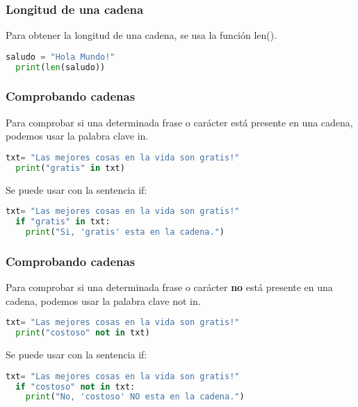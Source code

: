 \begin{frame}[fragile]
  \frametitle{Longitud de una cadena}

  Para obtener la longitud de una cadena, se usa la función
  \textcolor{codeKeyword}{len}().

  \vspace{\baselineskip}
  \begin{lstlisting}[language=Python]
  saludo = "Hola Mundo!"
  print(len(saludo))
  \end{lstlisting}
\end{frame}

\begin{frame}[fragile]
  \frametitle{Comprobando cadenas}

  Para comprobar si una determinada frase o carácter está presente
  en una cadena, podemos usar la palabra clave
  \textcolor{codeKeyword}{in}.

  \begin{lstlisting}[language=Python]
  txt= "Las mejores cosas en la vida son gratis!"
  print("gratis" in txt)
  \end{lstlisting}

  \pausa
  Se puede usar con la sentencia \textcolor{codeKeyword}{if}:

  \begin{lstlisting}[language=Python]
  txt= "Las mejores cosas en la vida son gratis!"
  if "gratis" in txt:
    print("Si, 'gratis' esta en la cadena.")
  \end{lstlisting}
\end{frame}

\begin{frame}[fragile]
  \frametitle{Comprobando cadenas}

  Para comprobar si una determinada frase o carácter \textbf{no}
  está presente en una cadena, podemos usar la palabra clave
  \textcolor{codeKeyword}{not in}.

  \begin{lstlisting}[language=Python]
  txt= "Las mejores cosas en la vida son gratis!"
  print("costoso" not in txt)
  \end{lstlisting}

  \pausa
  Se puede usar con la sentencia \textcolor{codeKeyword}{if}:

  \begin{lstlisting}[language=Python]
  txt= "Las mejores cosas en la vida son gratis!"
  if "costoso" not in txt:
    print("No, 'costoso' NO esta en la cadena.")
  \end{lstlisting}
\end{frame}


